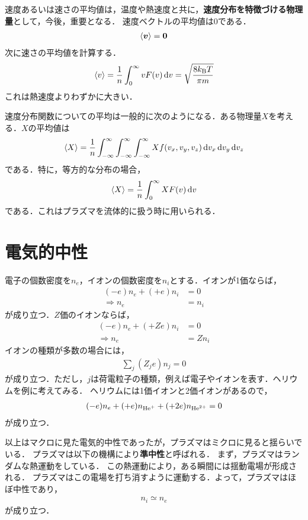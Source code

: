 \documentclass{report}
\begin{document}
  速度あるいは速さの平均値は，温度や熱速度と共に，\textbf{速度分布を特徴づける物理量}として，今後，重要となる．
  速度ベクトルの平均値は0である．
  \begin{align}
    \ev{\bm{v}} = \bm{0}
  \end{align}
  次に速さの平均値を計算する．
  \begin{align}
    \ev{v} = \frac{1}{n}\int_{0}^{\infty} v F(v) \dd{v} = \sqrt{\frac{8 \kb T}{\pi m}}
  \end{align}
  これは熱速度よりわずかに大きい．
  \par
  速度分布関数についての平均は一般的に次のようになる．ある物理量$X$を考える．$X$の平均値は
  \begin{align}
    \ev{X} = \frac{1}{n}\int_{-\infty}^{\infty} \int_{-\infty}^{\infty} \int_{-\infty}^{\infty} Xf(v_x, v_y, v_z) \dd{v_x}\dd{v_y}\dd{v_z}
  \end{align}
  である．特に，等方的な分布の場合，
  \begin{align}
    \ev{X} = \frac{1}{n} \int_{0}^{\infty} XF(v) \dd{v}
  \end{align}
  である．これはプラズマを流体的に扱う時に用いられる．
  \section{電気的中性}
    電子の個数密度を$n_e$，イオンの個数密度を$n_i$とする．イオンが1価ならば，
    \begin{align}
      (-e)n_e + (+e)n_i &= 0\\
      \Rightarrow n_e &= n_i
    \end{align}
    が成り立つ．$Z$価のイオンならば，
    \begin{align}
      (-e)n_e + (+Ze)n_i &= 0\\
      \Rightarrow n_e &= Zn_i
    \end{align}
    イオンの種類が多数の場合には，
    \begin{align}
      \sum_{j} (Z_j e)n_j = 0
    \end{align}
    が成り立つ．ただし，$j$は荷電粒子の種類，例えば電子やイオンを表す．ヘリウムを例に考えてみる．
    ヘリウムには1価イオンと2価イオンがあるので，
    \begin{align}
      (-e)n_e + (+e)n_{\mathrm{He}^{+}} + (+2e)n_{\mathrm{He}^{2+}} = 0
    \end{align}
    が成り立つ．
    \par
    以上はマクロに見た電気的中性であったが，プラズマはミクロに見ると揺らいでいる．
    プラズマは以下の機構により\textbf{準中性}と呼ばれる．
    まず，プラズマはランダムな熱運動をしている．
    この熱運動により，ある瞬間には揺動電場が形成される．
    プラズマはこの電場を打ち消すように運動する．よって，プラズマはほぼ中性であり，
    \begin{align}
      n_i \simeq n_e
    \end{align}
    が成り立つ．
\end{document}
